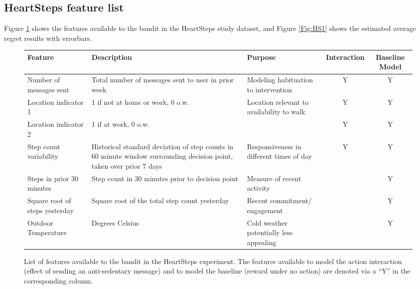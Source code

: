 \documentclass{article}
\begin{document}


\begin{appendices}
\section{HeartSteps feature list}
Figure \ref{Fig:HS1Feats} shows the features available to the bandit in the HeartSteps study dataset, and Figure \ref{Fig:HS1} shows the estimated average regret results with errorbars.
\begin{figure}[h]
\centering
\scriptsize{
\begin{tabular}{p{3cm}|p{3cm}|p{3cm}|c|c}
\textbf{Feature}             & \textbf{Description} & \textbf{Purpose}& \textbf{Interaction} & \textbf{Baseline Model }   \\
\hline
Number of messages sent & Total number of messages sent to user in prior week & Modeling habituation to intervention & Y & Y\\
\hline
Location indicator 1 & 1 if not at home or work, 0 o.w. & Location relevant to availability to walk & Y & Y  \\
\hline
Location indicator 2 & 1 if at work, 0 o.w. &  & Y & Y  \\
\hline
Step count variability & Historical standard deviation of step counts in 60 minute window surrounding decision point, taken over prior 7 days & Responsiveness in different times of day & Y & Y\\
\hline
Steps in prior 30 minutes  & Step count in 30 minutes prior to decision point & Measure of recent activity & & Y\\
\hline
Square root of steps yesterday  & Square root of the total step count yesterday & Recent commitment/ engagement &  & Y\\
\hline
Outdoor Temperature  & Degrees Celsius & Cold weather potentially less appealing &  & Y\\
\end{tabular}
}
\caption{List of features available to the bandit in the HeartSteps experiment. The features available to model the action interaction (effect of sending an anti-sedentary message) and to model the baseline (reward under no action) are denoted via a ``Y'' in the corresponding column. }
\label{Fig:HS1Feats}
\end{figure}


\end{appendices}
\end{document}
